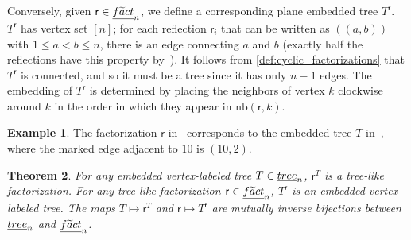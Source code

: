 \documentclass[a4paper,10pt,leqno]{amsart}
\numberwithin{equation}{section}
\newtheorem{theorem}{Theorem}[section]
\theoremstyle{definition}
\newtheorem{example}[theorem]{Example}
\theoremstyle{remark}
\newcommand{\T}{\textsc{tree}}
\newcommand{\Ft}{\textsc{f}\widetilde{\textsc{a}}\textsc{ct}}
\newcommand{\E}{\T}
\newcommand{\EE}{\underline{\E}}
\newcommand{\EFt}{\underline{\Ft}}
\newcommand{\rrT}{\rr^T}
\newcommand{\rr}{\mathsf{r}}
\newcommand{\Trr}{T^\rr}
\newcommand{\rrk}[1][k]{\mathrm{nb}(\rr,#1)}
\begin{document}
Conversely, given $\rr \in \EFt_n$, we define a corresponding plane embedded tree $\Trr$.  $\Trr$ has vertex set $[n]$; for each reflection $\rr_i$ that can be written as $(\!(a,b)\!)$ with $1 \leq a < b \leq n$, there is an edge connecting $a$ and $b$ (exactly half the reflections have this property by~).  It follows from \cref{def:cyclic_factorizations} that $\Trr$ is connected, and so it must be a tree since it has only $n-1$ edges.  The embedding of $\Trr$ is determined by placing the neighbors of vertex $k$ clockwise around $k$ in the order in which they appear in $\rrk$.

\begin{example}
  The factorization $\rr$ in~ corresponds to the embedded tree $T$ in~, where the marked edge adjacent to $10$ is $(10,2)$.
\end{example}

\begin{theorem}
\label{thm:tree_like}
  For any embedded vertex-labeled tree $T \in \EE_n$, $\rrT$ is a tree-like factorization.  For any tree-like factorization $\rr \in \EFt_n$, $\Trr$ is an embedded vertex-labeled tree.  The maps $T\mapsto \rrT$ and $\rr \mapsto \Trr$ are mutually inverse bijections between $\EE_n$ and $\EFt_n$.%
\end{theorem}
\end{document}
